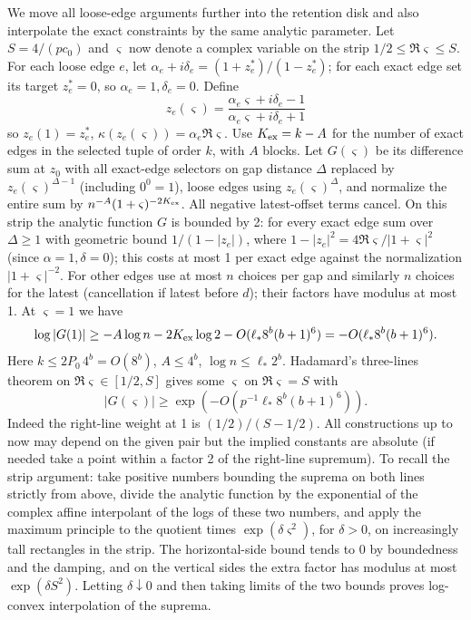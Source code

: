 \documentclass[11pt]{article}
\begin{document}
We move all loose-edge arguments further into the retention disk and also interpolate the exact constraints by the same analytic parameter. Let \(S=4/(p c_0)\) and \(\varsigma\) now denote a complex variable on the strip \(1/2\le\Re\varsigma\le S\). For each loose edge \(e\), let \(\alpha_e+i\delta_e=(1+z_e^*)/(1-z_e^*)\); for each exact edge set its target \(z_e^*=0\), so \(\alpha_e=1,\delta_e=0\). Define
\[
 z_e(\varsigma)=\frac{\alpha_e\varsigma+i\delta_e-1}{\alpha_e\varsigma+i\delta_e+1}
\]
so \(z_e(1)=z_e^*\), \(\kappa(z_e(\varsigma))=\alpha_e\Re\varsigma\). Use \(K_{\rm ex}=k-A\) for the number of exact edges in the selected tuple of order \(k\), with \(A\) blocks. Let \(G(\varsigma)\) be its difference sum at \(z_0\) with all exact-edge selectors on gap distance \(\Delta\) replaced by \(z_e(\varsigma)^{\Delta-1}\) (including \(0^0=1\)), loose edges using \(z_e(\varsigma)^\Delta\), and normalize the entire sum by \(n^{-A}(1+\varsigma)^{-2K_{\rm ex}}\). All negative latest-offset terms cancel. On this strip the analytic function \(G\) is bounded by 2: for every exact edge sum over \(\Delta\ge1\) with geometric bound \(1/(1-|z_e|)\), where \(1-|z_e|^2=4\Re\varsigma/|1+\varsigma|^2\) (since \(\alpha=1,\delta=0\)); this costs at most 1 per exact edge against the normalization \(|1+\varsigma|^{-2}\). For other edges use at most \(n\) choices per gap and similarly \(n\) choices for the latest (cancellation if latest before \(d\)); their factors have modulus at most 1. At \(\varsigma=1\) we have
\[
 \log |G(1)|\ge -A\log n-2K_{\rm ex}\log 2-O(\ell_*8^b(b+1)^6)
             = -O(\ell_*8^b(b+1)^6).
\]
Here \(k\le2P_0\,4^b=O(8^b)\), \(A\le4^b\), \(\log n\le\ell_*2^b\). Hadamard's three-lines theorem on \(\Re\varsigma\in[1/2,S]\) gives some \(\varsigma\) on \(\Re\varsigma=S\) with
\[
 |G(\varsigma)|\ge \exp(-O(p^{-1}\ell_*8^b(b+1)^6)).
 \tag{9}
\]
Indeed the right-line weight at 1 is \((1/2)/(S-1/2)\). All constructions up to now may depend on the given pair but the implied constants are absolute (if needed take a point within a factor 2 of the right-line supremum). To recall the strip argument: take positive numbers bounding the suprema on both lines strictly from above, divide the analytic function by the exponential of the complex affine interpolant of the logs of these two numbers, and apply the maximum principle to the quotient times \(\exp(\delta\varsigma^2)\), for \(\delta>0\), on increasingly tall rectangles in the strip. The horizontal-side bound tends to 0 by boundedness and the damping, and on the vertical sides the extra factor has modulus at most \(\exp(\delta S^2)\). Letting \(\delta\downarrow0\) and then taking limits of the two bounds proves log-convex interpolation of the suprema.
\end{document}
